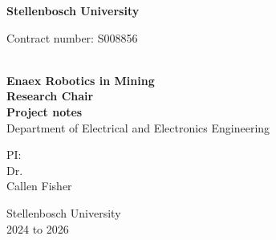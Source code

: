 \thispagestyle{empty}
\begin{center}
{\textbf{Stellenbosch University}}\\
\vskip 20pt

\begin{flushleft}
\hskip 320pt { 
Contract number: S008856
}
\end{flushleft}
\vskip 90pt
{\textbf{\Large }}\\
\vskip 60pt
{\LARGE \textbf{
Enaex Robotics in Mining}}\\
\vskip 25pt
\textbf{\large Research Chair}\\
\vskip 40pt
\textbf{\Large Project notes} \\
\vskip 40pt
Department of Electrical and Electronics Engineering \\
\vskip 60pt
\begin{flushleft}
\hskip 350pt {\Large PI:
}\\
\vskip 5pt
\hskip 350pt {\Large Dr.}\\
\vskip 5pt
\hskip 350pt {\Large Callen Fisher}
\end{flushleft}
\vskip 100pt

Stellenbosch University\\
\vskip 10pt
2024 to 2026
\end{center}
